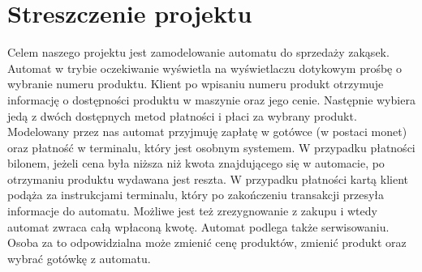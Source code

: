\documentclass[11pt]{article}
\begin{document}
	\tableofcontents
	\cleardoublepage
	\setcounter{page}{2}
	
	\section{Streszczenie projektu}
		Celem naszego projektu jest zamodelowanie automatu do sprzedaży zakąsek.
		Automat w trybie oczekiwanie wyświetla na wyświetlaczu dotykowym prośbę o wybranie numeru produktu. Klient po wpisaniu numeru produkt otrzymuje informację o dostępności produktu w maszynie oraz jego cenie. Następnie wybiera jedą z dwóch dostępnych metod płatności i płaci za wybrany produkt. Modelowany przez nas automat przyjmuję zapłatę w gotówce (w postaci monet) oraz płatność w terminalu, który jest osobnym systemem. W przypadku płatności bilonem, jeżeli cena była niższa niż kwota znajdującego się w automacie, po otrzymaniu produktu wydawana jest reszta. W przypadku płatności kartą klient podąża za instrukcjami terminalu, który po zakończeniu transakcji przesyła informacje do automatu. Możliwe jest też zrezygnowanie z zakupu i wtedy automat zwraca całą wpłaconą kwotę. Automat podlega także serwisowaniu. Osoba za to odpowidzialna może zmienić cenę produktów, zmienić produkt oraz wybrać gotówkę z automatu.
	
\end{document}
